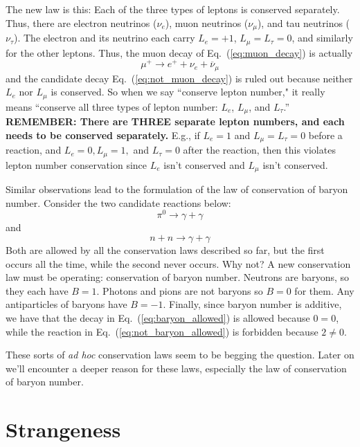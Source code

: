 The new law is this:  Each of the three types of leptons is conserved
separately.  Thus, there are electron neutrinos ($\nu_e$), muon
neutrinos ($\nu_\mu$), and tau neutrinos ($\nu_\tau$).  The electron
and its neutrino each carry $L_e = +1$, $L_\mu = L_\tau = 0$, and
similarly for the other leptons.  Thus, the muon decay of
Eq.~(\ref{eq:muon_decay}) is actually
\begin{equation}
\mu^+ \to e^+ + \nu_e + \overline\nu_\mu
\end{equation}
and the candidate decay Eq.~(\ref{eq:not_muon_decay}) is ruled out
because neither $L_e$ nor $L_\mu$ is conserved.
So when we say ``conserve lepton number," it really means
``conserve all three types of lepton number:  $L_e$, $L_\mu$, and 
$L_\tau$.'' {\bf REMEMBER: There are THREE separate lepton numbers, and 
each needs to be conserved separately.} E.g., if $L_e = 1$ and $L_\mu =
L_\tau = 0$ before a reaction, and $L_e = 0, L_\mu = 1,$ and $L_\tau = 0$ after
the reaction, then this violates lepton number conservation since $L_e$ isn't
conserved and $L_\mu$ isn't conserved.

Similar observations lead to the formulation of the law of
conservation of baryon number.  Consider the two candidate reactions
below:
\begin{equation}
\pi^0 \to \gamma + \gamma
\label{eq:baryon_allowed}
\end{equation}
and
\begin{equation}
n + n \to \gamma + \gamma
\label{eq:not_baryon_allowed}
\end{equation}
Both are allowed by all the conservation laws described so far, but
the first occurs all the time, while the second never occurs.  Why
not?  A new conservation law must be operating: conservation of baryon
number.  Neutrons are baryons, so they each have $B = 1$.  Photons and
pions are not baryons so $B = 0$ for them.  Any antiparticles of
baryons have $B = -1$.  Finally, since baryon number is additive, we
have that the decay in Eq.~(\ref{eq:baryon_allowed}) is allowed
because $0=0$, while the reaction in Eq.~(\ref{eq:not_baryon_allowed})
is forbidden because $2 \neq 0$.

These sorts of {\em ad hoc} conservation laws seem to be begging the
question.  Later on we'll encounter a deeper reason for these laws,
especially the law of conservation of baryon number.


\section{Strangeness}
\label{sec:strangeness}

